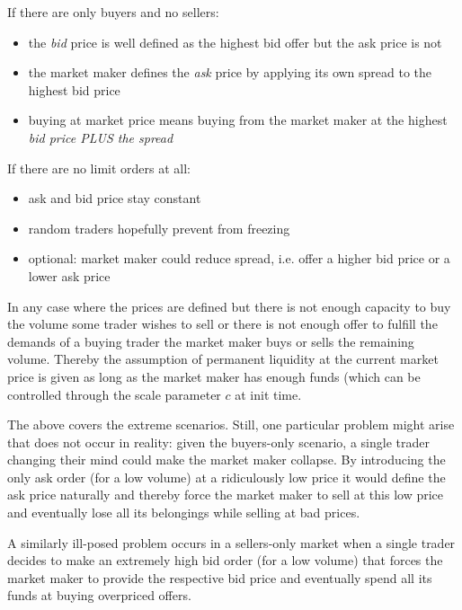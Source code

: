 If there are only buyers and no sellers:
\begin{itemize}
    \item the \textit{bid} price is well defined as the highest bid offer but the ask price is not
    \item the market maker defines the \textit{ask} price by applying its own spread to the highest bid price
    \item buying at market price means buying from the market maker at the highest \textit{bid price PLUS the spread}
\end{itemize}

If there are no limit orders at all:
\begin{itemize}
    \item ask and bid price stay constant
    \item random traders hopefully prevent from freezing
    \item optional: market maker could reduce spread, i.e. offer a higher bid price
    or a lower ask price
\end{itemize}

In any case where the prices are defined but there is not enough capacity to buy the
volume some trader wishes to sell or there is not enough offer to fulfill the demands
of a buying trader the market maker buys or sells the remaining volume. Thereby the
assumption of permanent liquidity at the current market price is given as long as the
market maker has enough funds (which can be controlled through the scale parameter $c$
at init time.

The above covers the extreme scenarios. Still, one particular problem might arise that
does not occur in reality: given the buyers-only scenario, a single trader changing
their mind could make the market maker collapse. By introducing the only ask order (for a low volume) at 
a ridiculously low price it would define the ask price naturally and thereby force
the market maker to sell at this low price and eventually lose all its belongings
while selling at bad prices.

A similarly ill-posed problem occurs in a sellers-only market when a single trader
decides to make an extremely high bid order (for a low volume) that forces the market
maker to provide the respective bid price and eventually spend all its funds at buying
overpriced offers.


